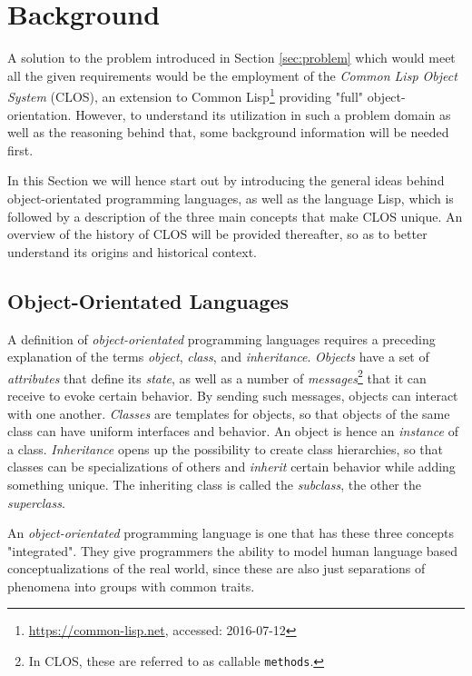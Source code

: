 \documentclass[oribibl]{llncs}
\begin{document}
\section{Background}
\label{sec:background}
A solution to the problem introduced in Section \ref{sec:problem} which would meet all the given requirements would be the employment of the \emph{Common Lisp Object System} (CLOS), an extension to Common Lisp\footnote{\url{https://common-lisp.net}, accessed: 2016-07-12} providing "full" object-orientation. \cite{demichiel1987common} However, to understand its utilization in such a problem domain as well as the reasoning behind that, some background information will be needed first.

In this Section we will hence start out by introducing the general ideas behind object-orientated programming languages, as well as the language Lisp, which is followed by a description of the three main concepts that make CLOS unique. An overview of the history of CLOS will be provided thereafter, so as to better understand its origins and historical context.

\subsection{Object-Orientated Languages}
\label{sec:oo}

A definition of \emph{object-orientated} programming languages requires a preceding explanation of the terms \emph{object}, \emph{class}, and \emph{inheritance}. \emph{Objects} have a set of \emph{attributes} that define its \emph{state}, as well as a number of \emph{messages}\footnote{In CLOS, these are referred to as callable \texttt{methods}.} that it can receive to evoke certain behavior. By sending such messages, objects can interact with one another. \emph{Classes} are templates for objects, so that objects of the same class can have uniform interfaces and behavior. An object is hence an \emph{instance} of a class. \emph{Inheritance} opens up the possibility to create class hierarchies, so that classes can be specializations of others and \emph{inherit} certain behavior while adding something unique. The inheriting class is called the \emph{subclass}, the other the \emph{superclass}.

An \emph{object-orientated} programming language is one that has these three concepts "integrated". They give programmers the ability to model human language based conceptualizations of the real world, since these are also just separations of phenomena into groups with common traits.
\end{document}
